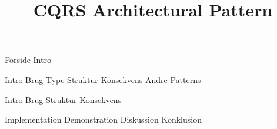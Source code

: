 \documentclass[a4paper,openany]{memoir}
\title{CQRS Architectural Pattern}
\begin{document}
	{Forside}  \newpage
	\tableofcontents\thispagestyle{fancy}  \newpage
	{Intro}  \newpage

	{Intro}
	{Brug}
	{Type}
	{Struktur}
	{Konsekvens}
	{Andre-Patterns}
	
	{Intro}
	{Brug}
	{Struktur}
	{Konsekvens}

	{Implementation}
	{Demonstration}
	{Diskussion}
	{Konklusion}\newpage

	\printbibliography
	\listoffixmes
	
\end{document}
